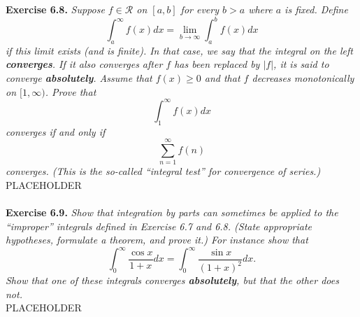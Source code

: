 \documentclass{article}
\begin{document}



\textbf{Exercise 6.8.}
\emph{Suppose $f \in \mathscr{R}$ on $[a,b]$ for every $b > a$ where $a$ is fixed.
Define
\[
  \int_{a}^{\infty} f(x) dx
  = \lim_{b \to \infty} \int^b_a f(x) dx
\]
if this limit exists (and is finite).
In that case, we say that the integral on the left \textbf{converges}.
If it also converges after $f$ has been replaced by $|f|$,
it is said to converge \textbf{absolutely}.
Assume that $f(x) \geq 0$ and that $f$ decreases monotonically on $[1,\infty)$.
Prove that
\[
  \int_1^{\infty} f(x) dx
\]
converges if and only if
\[
  \sum_{n=1}^{\infty} f(n)
\]
converges.
(This is the so-called ``integral test'' for convergence of series.)} \\

PLACEHOLDER \\\\






\textbf{Exercise 6.9.}
\emph{Show that integration by parts can sometimes be applied to the
``improper'' integrals defined in Exercise 6.7 and 6.8.
(State appropriate hypotheses, formulate a theorem, and prove it.)
For instance show that
\[
  \int_{0}^{\infty} \frac{\cos x}{1+x} dx
  = \int_{0}^{\infty} \frac{\sin x}{(1+x)^2} dx.
\]
Show that one of these integrals converges \textbf{absolutely}, but that
the other does not.} \\

PLACEHOLDER \\\\



\end{document}
